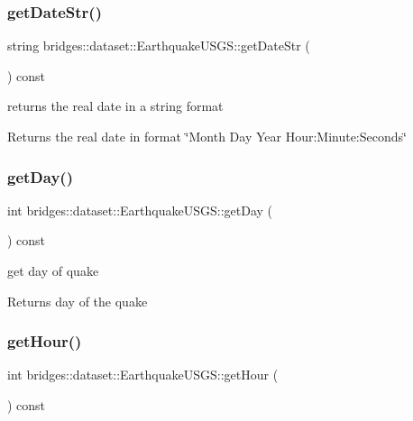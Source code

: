 \subsubsection{\texorpdfstring{get\+Date\+Str()}{getDateStr()}}
{\footnotesize\ttfamily string bridges\+::dataset\+::\+Earthquake\+U\+S\+G\+S\+::get\+Date\+Str (\begin{DoxyParamCaption}{ }\end{DoxyParamCaption}) const\hspace{0.3cm}{\ttfamily [inline]}}



returns the real date in a string format 

\begin{DoxyReturn}{Returns}
the real date in format \char`\"{}\+Month Day Year Hour\+:\+Minute\+:\+Seconds\char`\"{} 
\end{DoxyReturn}
\mbox{\label{classbridges_1_1dataset_1_1_earthquake_u_s_g_s_a6052793e29a4d9708ebf35cb8477ed0d}} 
\subsubsection{\texorpdfstring{get\+Day()}{getDay()}}
{\footnotesize\ttfamily int bridges\+::dataset\+::\+Earthquake\+U\+S\+G\+S\+::get\+Day (\begin{DoxyParamCaption}{ }\end{DoxyParamCaption}) const\hspace{0.3cm}{\ttfamily [inline]}}



get day of quake 

\begin{DoxyReturn}{Returns}
day of the quake 
\end{DoxyReturn}
\mbox{\label{classbridges_1_1dataset_1_1_earthquake_u_s_g_s_a43e64f31d62d11ad554be5f5388720f6}} 
\subsubsection{\texorpdfstring{get\+Hour()}{getHour()}}
{\footnotesize\ttfamily int bridges\+::dataset\+::\+Earthquake\+U\+S\+G\+S\+::get\+Hour (\begin{DoxyParamCaption}{ }\end{DoxyParamCaption}) const\hspace{0.3cm}{\ttfamily [inline]}}



